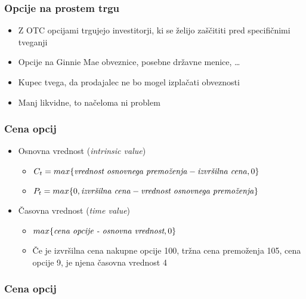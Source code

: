 \documentclass[14pt]{beamer}
\begin{document}
\begin{frame}    
    \frametitle{Opcije na prostem trgu}
    \begin{itemize}
        \item Z OTC opcijami trgujejo investitorji, ki se želijo zaščititi pred specifičnimi tveganji
        \item Opcije na Ginnie Mae obveznice, posebne državne menice, \ldots
        \item Kupec tvega, da prodajalec ne bo mogel izplačati obveznosti
        \item Manj likvidne, to načeloma ni problem
    \end{itemize}
\end{frame}

\begin{frame}
    \frametitle{Cena opcij}
    \begin{itemize}
        \item Osnovna vrednost (\textit{intrinsic value})
        \begin{itemize}
            \item $C_{t} = max\{\text{\textit{vrednost osnovnega premoženja}} - \text{\textit{izvršilna cena}}, 0\}$
            \item $P_{t} = max\{0, \text{\textit{izvršilna cena}} - \text{\textit{vrednost osnovnega premoženja}}\}$
        \end{itemize}
        \pause
            \item Časovna vrednost (\textit{time value})
            \begin{itemize}
                \item $max\{\textit{\text{cena opcije} - \text{osnovna vrednost}},0 \}$
                \item Če je izvršilna cena nakupne opcije 100\textdollar, tržna cena premoženja 105\textdollar, cena opcije 9\textdollar, je njena časovna vrednost 4\textdollar
            \end{itemize}
    \end{itemize}
\end{frame}

\begin{frame}
    \frametitle{Cena opcij}
       
\end{frame}
\end{document}
